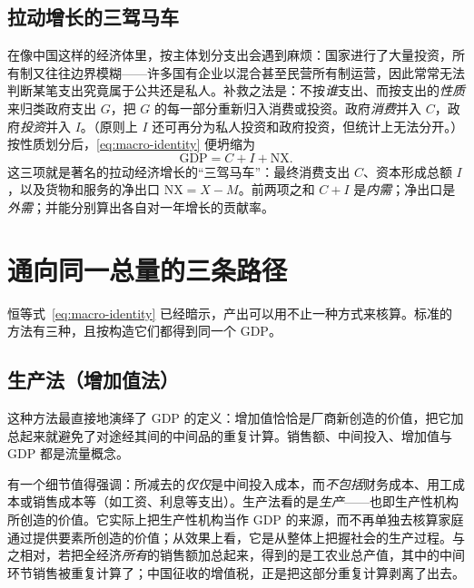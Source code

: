 \subsection{拉动增长的三驾马车}

在像中国这样的经济体里，按主体划分支出会遇到麻烦：国家进行了大量投资，所有制又往往边界模糊——许多国有企业以混合甚至民营所有制运营，因此常常无法判断某笔支出究竟属于公共还是私人。补救之法是：不按\emph{谁}支出、而按支出的\emph{性质}来归类政府支出 $G$，把 $G$ 的每一部分重新归入消费或投资。政府\emph{消费}并入 $C$，政府\emph{投资}并入 $I$。（原则上 $I$ 还可再分为私人投资和政府投资，但统计上无法分开。）按性质划分后，\eqref{eq:macro-identity} 便坍缩为
\begin{equation}
\mathrm{GDP} = C + I + \mathrm{NX}.
\label{eq:macro-three-drivers}
\end{equation}
这三项就是著名的拉动经济增长的“三驾马车”：最终消费支出 $C$、资本形成总额 $I$，以及货物和服务的净出口 $\mathrm{NX} = X - M$。前两项之和 $C + I$ 是\emph{内需}；净出口是\emph{外需}；并能分别算出各自对一年增长的贡献率。

\section{通向同一总量的三条路径}

恒等式~\eqref{eq:macro-identity} 已经暗示，产出可以用不止一种方式来核算。标准的方法有三种，且按构造它们都得到同一个 GDP。

\subsection{生产法（增加值法）}


这种方法最直接地演绎了 GDP 的定义：增加值恰恰是厂商新创造的价值，把它加总起来就避免了对途经其间的中间品的重复计算。销售额、中间投入、增加值与 GDP 都是流量概念。

有一个细节值得强调：所减去的\emph{仅仅}是中间投入成本，而\emph{不包括}财务成本、用工成本或销售成本等（如工资、利息等支出）。生产法看的是\emph{生产}——也即生产性机构所创造的价值。它实际上把生产性机构当作 GDP 的来源，而不再单独去核算家庭通过提供要素所创造的价值；从效果上看，它是从整体上把握社会的生产过程。与之相对，若把全经济\emph{所有}的销售额加总起来，得到的是工农业总产值，其中的中间环节销售被重复计算了；中国征收的增值税，正是把这部分重复计算剥离了出去。

